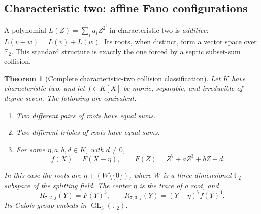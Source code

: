 \documentclass[11pt,a4paper]{article}
\newtheorem{theorem}{Theorem}[section]
\theoremstyle{definition}
\theoremstyle{remark}
\newcommand{\F}{\mathbb F}
\begin{document}
\subsection{Characteristic two: affine Fano configurations}

A polynomial $L(Z)=\sum_i a_iZ^{2^i}$ in characteristic two is
\emph{additive}: $L(v+w)=L(v)+L(w)$. Its roots, when distinct, form a
vector space over $\F_2$. This standard structure is exactly the one forced
by a septic subset-sum collision.

\begin{theorem}[Complete characteristic-two collision classification]
\label{rss:thm:2rigidity}
Let $K$ have characteristic two, and let $f\in K[X]$ be monic, separable,
and irreducible of degree seven. The following are equivalent:
\begin{enumerate}[label=(\roman*)]
\item Two different pairs of roots have equal sums.
\item Two different triples of roots have equal sums.
\item For some $\eta,a,b,d\in K$, with $d\neq0$,
\begin{equation}
 f(X)=F(X-\eta),\qquad F(Z)=Z^7+aZ^3+bZ+d.
 \label{rss:eq:additivequotient}
\end{equation}
\end{enumerate}
In this case the roots are $\eta+(W\setminus\{0\})$, where $W$ is a
three-dimensional $\F_2$-subspace of the splitting field. The center
$\eta$ is the trace of a root, and
\begin{equation}
 R_{7,2,f}(Y)=F(Y)^3,\qquad
 R_{7,3,f}(Y)=(Y-\eta)^7f(Y)^4.
 \label{rss:eq:Fanoresolvents}
\end{equation}
Its Galois group embeds in $\operatorname{GL}_3(\F_2)$.
\end{theorem}
\end{document}
